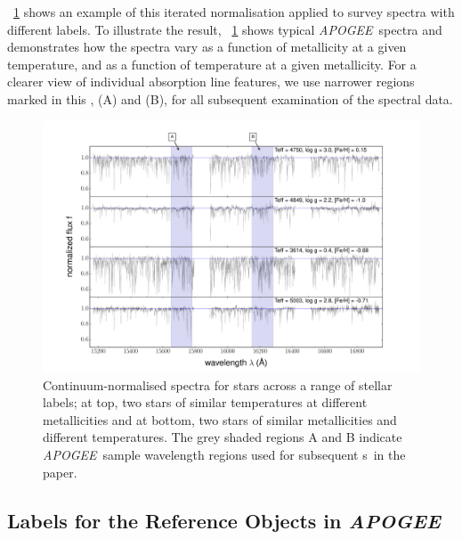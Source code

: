 \documentclass[12pt, preprint]{aastex}
\newcommand{\figurenames}{\figurename s}
\newcommand{\apogee}{\textsl{APOGEE}}
\begin{document}
\figurename~\ref{fig:norm} shows an example of this iterated normalisation applied to survey spectra with different labels. To illustrate the result, \figurename~\ref{fig:norm} shows typical \apogee\ spectra and demonstrates how the spectra 
vary as a function of metallicity at a given temperature, and as a function of temperature at a given metallicity. 
For a clearer view of individual absorption line features, we use narrower regions marked in this \figurename, (A) and (B), for all subsequent examination of the spectral data. 

\begin{figure}[h!]
  \includegraphics[width=\hsize]{./plots/four_examples3.pdf}
\caption{Continuum-normalised spectra for stars across a range of stellar labels; at top, two stars of similar temperatures at different metallicities and at bottom, two stars of similar metallicities and different temperatures. The grey shaded regions A and B indicate \apogee\ sample wavelength regions used for subsequent \figurenames\ in the paper.}
\label{fig:norm}
\end{figure}



\subsection{Labels for the Reference Objects in \apogee}
\label{sec:ApogeeRefLabels}
\end{document}

